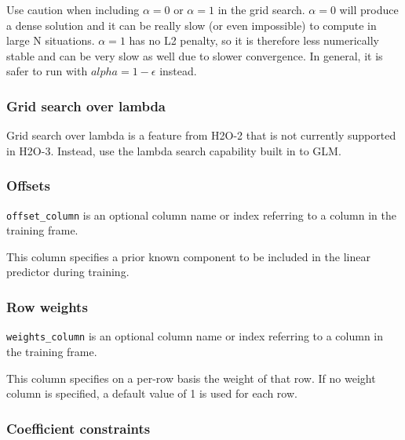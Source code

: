 Use caution when including $\alpha=0$ or $\alpha=1$ in the grid search. $\alpha=0$ will produce a dense solution
and it can be really slow (or even impossible) to compute in large N situations. $\alpha=1$ has no L2 penalty, so
it is therefore less numerically stable and can be very slow as well due to slower convergence. In general, it is
safer to run with $alpha=1-\epsilon$ instead.

\bigskip
\waterExampleInR


\subsubsection{Grid search over lambda}


% 

Grid search over lambda is a feature from H2O-2 that is not currently supported in H2O-3.  Instead, use the lambda
search capability built in to GLM.

\subsubsection{Offsets}

\texttt{offset\_column} is an optional column name or index referring to a column in the training frame.

This column specifies a prior known component to be included in the linear predictor during training.

\subsubsection{Row weights}

\texttt{weights\_column} is an optional column name or index referring to a column in the training frame.

This column specifies on a per-row basis the weight of that row.  If no weight column is specified, a default value
of 1 is used for each row.

\subsubsection{Coefficient constraints}

